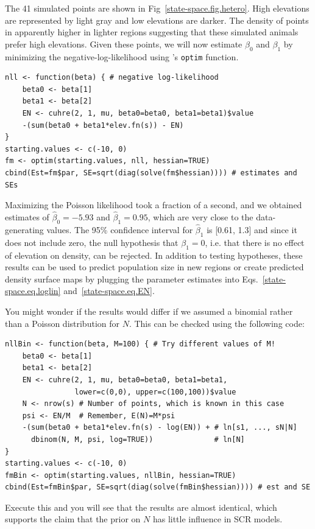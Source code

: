 The 41 simulated points are shown in
Fig~\ref{state-space.fig.hetero}. High elevations
are represented by light gray and low elevations are darker. The
density of points in apparently higher in lighter regions
suggesting that these simulated animals prefer high
elevations.  %
Given these points, we will now estimate $\beta_0$ and $\beta_1$ by
minimizing the negative-log-likelihood using \R's \verb+optim+
function.

\begin{small}
\begin{verbatim}
nll <- function(beta) { # negative log-likelihood
    beta0 <- beta[1]
    beta1 <- beta[2]
    EN <- cuhre(2, 1, mu, beta0=beta0, beta1=beta1)$value
    -(sum(beta0 + beta1*elev.fn(s)) - EN)
}
starting.values <- c(-10, 0)
fm <- optim(starting.values, nll, hessian=TRUE)
cbind(Est=fm$par, SE=sqrt(diag(solve(fm$hessian)))) # estimates and SEs
\end{verbatim}
\end{small}

Maximizing the Poisson likelihood took a fraction of a second, and we
obtained estimates of $\hat{\beta}_0=-5.93$ and $\hat{\beta}_1=0.95$,
which are very close to the data-generating values. The 95\% confidence
interval for $\hat{\beta}_1$ is [0.61, 1.3] and since it does not
include zero, the null hypothesis that $\beta_1=0$, i.e. that there is
no effect of elevation on density, can be rejected. In addition to testing
hypotheses, these results can be used to predict population size in
new regions or create predicted density surface maps by plugging the
parameter estimates into Eqs.~\ref{state-space.eq.loglin} and~\ref{state-space.eq.EN}.

You might wonder if the results would differ if we assumed a binomial
rather than a Poisson distribution for $N$. This can be checked
using the following code:
\begin{small}
\begin{verbatim}
nllBin <- function(beta, M=100) { # Try different values of M!
    beta0 <- beta[1]
    beta1 <- beta[2]
    EN <- cuhre(2, 1, mu, beta0=beta0, beta1=beta1,
                lower=c(0,0), upper=c(100,100))$value
    N <- nrow(s) # Number of points, which is known in this case
    psi <- EN/M  # Remember, E(N)=M*psi
    -(sum(beta0 + beta1*elev.fn(s) - log(EN)) + # ln[s1, ..., sN|N]
      dbinom(N, M, psi, log=TRUE))              # ln[N]
}
starting.values <- c(-10, 0)
fmBin <- optim(starting.values, nllBin, hessian=TRUE)
cbind(Est=fmBin$par, SE=sqrt(diag(solve(fmBin$hessian)))) # est and SE
\end{verbatim}
\end{small}
Execute this and you will see that the results are almost identical,
which supports the claim that the prior
on $N$ has little influence in SCR models.

